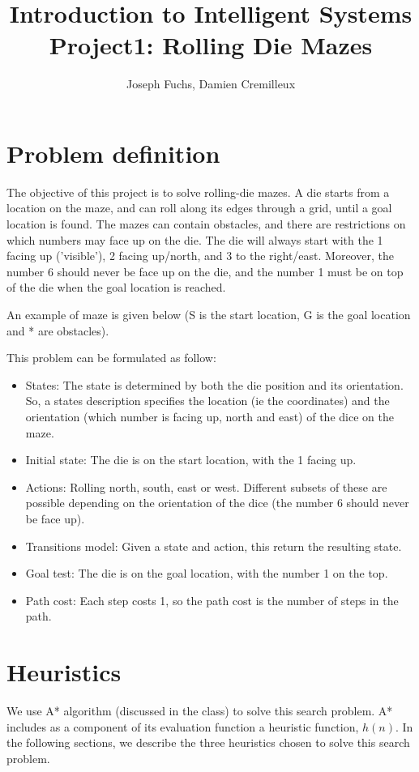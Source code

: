 \documentclass[]{article}
\title{Introduction to Intelligent Systems \\ Project1: Rolling Die Mazes}
\author{Joseph Fuchs, Damien Cremilleux}
\begin{document}
\maketitle

\section{Problem definition}
The objective of this project is to solve rolling-die mazes.
A die starts from a location on the maze, and can roll along its edges through a grid, until a goal location is found.
The mazes can contain obstacles, and there are restrictions on which numbers may face up on the die.
The die will always start with the 1 facing up ('visible'), 2 facing up/north, and 3 to the right/east.
Moreover, the number 6 should never be face up on the die, and the number 1 must be on top of the die when the goal location is reached.

\medskip

An example of maze is given below (S is the start location, G is the goal location and * are obstacles).



\medskip

This problem can be formulated as follow:
\begin{itemize}
\item States: The state is determined by both the die position and its orientation.
So, a states description specifies the location (ie the coordinates) and the orientation (which number is facing up, north and east) of the dice on the maze.
\item Initial state: The die is on the start location, with the 1 facing up.
\item Actions: Rolling north, south, east or west. Different subsets of these are possible depending on the orientation of the dice (the number 6 should never be face up).
\item Transitions model: Given a state and action, this return the resulting state.
\item Goal test: The die is on the goal location, with the number 1 on the top.
\item Path cost: Each step costs 1, so the path cost is the number of steps in the path.
\end{itemize}

\section{Heuristics}
We use A* algorithm (discussed in the class) to solve this search problem.
A* includes as a component of its evaluation function a heuristic function, $h(n)$.
In the following sections, we describe the three heuristics chosen to solve this search problem.
\end{document}
